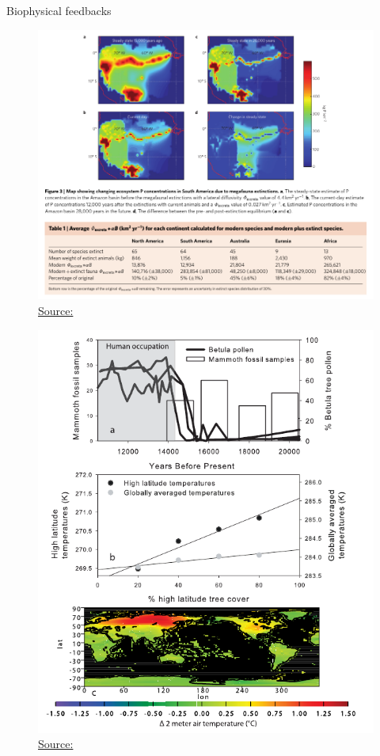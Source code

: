 \documentclass{beamer}
\begin{document}
\begin{frame}{Biophysical feedbacks}
\begin{figure}
\includegraphics[width=\linewidth]{./Images/AmazonNutrient_doughty2013.png}
\caption{\label{fig:AmazonP} \href{https://www.nature.com/articles/ngeo1895}{\tiny Source: \citep{doughty2013AmazonNutrient} }}
\end{figure}
\end{frame}


\begin{frame}
\begin{figure}
\includegraphics[width=0.7\linewidth]{./Images/doughty_betula_2010.png}
\caption{\label{fig:Betula} \href{https://agupubs.onlinelibrary.wiley.com/doi/full/10.1029/2010GL043985}{\tiny Source: \citep{doughty2010Betula} }}
\end{figure}
\end{frame}
\end{document}
